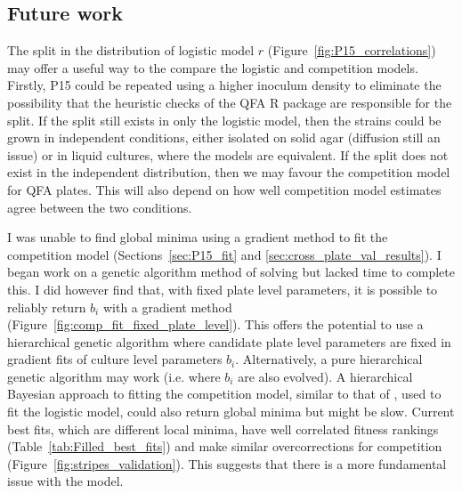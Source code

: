\subsection{Future work}

The split in the distribution of logistic model \(r\)
(Figure~\ref{fig:P15_correlations}) may offer a useful way to the
compare the logistic and competition models. Firstly, P15 could be
repeated using a higher inoculum density to eliminate the possibility
that the heuristic checks of the QFA R package are responsible for the
split. If the split still exists in only the logistic model, then the
strains could be grown in independent conditions, either isolated on
solid agar (diffusion still an issue) or in liquid cultures, where the
models are equivalent. If the split does not exist in the independent
distribution, then we may favour the competition model for QFA
plates. This will also depend on how well competition model estimates
agree between the two conditions.


I was unable to find global minima using a gradient method to fit the
competition model (Sections~\ref{sec:P15_fit} and
\ref{sec:cross_plate_val_results}). I began work on a genetic
algorithm method of solving but lacked time to complete this. I did
however find that, with fixed plate level parameters, it is possible
to reliably return \(b_{i}\) with a gradient method
(Figure~\ref{fig:comp_fit_fixed_plate_level}). This offers the
potential to use a hierarchical genetic algorithm where candidate
plate level parameters are fixed in gradient fits of culture level
parameters \(b_{i}\). Alternatively, a pure hierarchical genetic
algorithm may work (i.e. where \(b_{i}\) are also evolved). A
hierarchical Bayesian approach to fitting the competition model,
similar to that of \citet{Heydari2016}, used to fit the logistic
model, could also return global minima but might be slow. Current best
fits, which are different local minima, have well correlated fitness
rankings (Table~\ref{tab:Filled_best_fits}) and make similar
overcorrections for competition
(Figure~\ref{fig:stripes_validation}). This suggests that there is a
more fundamental issue with the model.

